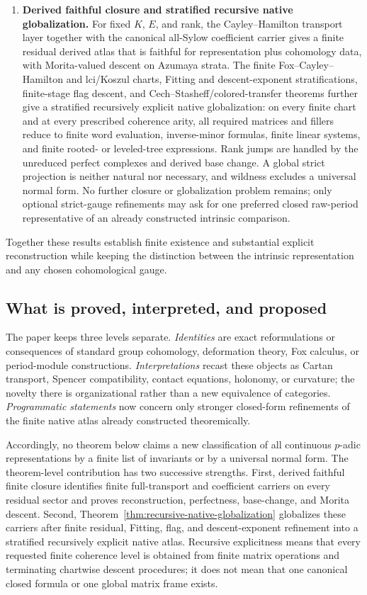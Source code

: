 \documentclass[11pt]{article}
\theoremstyle{definition}
\begin{document}
\begin{enumerate}[label=\textbf{(\arabic*)}]
\item \textbf{Derived faithful closure and stratified recursive native globalization.}
For fixed $K$, $E$, and rank, the Cayley--Hamilton transport layer together with the canonical all-Sylow coefficient carrier gives a finite residual derived atlas that is faithful for representation plus cohomology data, with Morita-valued descent on Azumaya strata.  The finite Fox--Cayley--Hamilton and lci/Koszul charts, Fitting and descent-exponent stratifications, finite-stage flag descent, and Cech--Stasheff/colored-transfer theorems further give a stratified recursively explicit native globalization: on every finite chart and at every prescribed coherence arity, all required matrices and fillers reduce to finite word evaluation, inverse-minor formulas, finite linear systems, and finite rooted- or leveled-tree expressions.  Rank jumps are handled by the unreduced perfect complexes and derived base change.  A global strict projection is neither natural nor necessary, and wildness excludes a universal normal form.  No further closure or globalization problem remains; only optional strict-gauge refinements may ask for one preferred closed raw-period representative of an already constructed intrinsic comparison.
\end{enumerate}

Together these results establish finite existence and substantial explicit reconstruction while keeping the distinction between the intrinsic representation and any chosen cohomological gauge.

\subsection{What is proved, interpreted, and proposed}

The paper keeps three levels separate.  \emph{Identities} are exact reformulations or consequences of standard group cohomology, deformation theory, Fox calculus, or period-module constructions.  \emph{Interpretations} recast these objects as Cartan transport, Spencer compatibility, contact equations, holonomy, or curvature; the novelty there is organizational rather than a new equivalence of categories.  \emph{Programmatic statements} now concern only stronger closed-form refinements of the finite native atlas already constructed theoremically.

Accordingly, no theorem below claims a new classification of all continuous $p$-adic representations by a finite list of invariants or by a universal normal form.  The theorem-level contribution has two successive strengths.  First, derived faithful finite closure identifies finite full-transport and coefficient carriers on every residual sector and proves reconstruction, perfectness, base-change, and Morita descent.  Second, Theorem~\ref{thm:recursive-native-globalization} globalizes these carriers after finite residual, Fitting, flag, and descent-exponent refinement into a stratified recursively explicit native atlas.  Recursive explicitness means that every requested finite coherence level is obtained from finite matrix operations and terminating chartwise descent procedures; it does not mean that one canonical closed formula or one global matrix frame exists.
\end{document}
